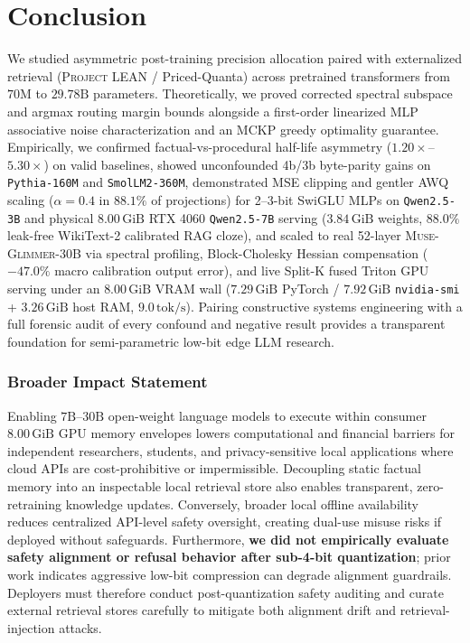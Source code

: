 \documentclass[10pt]{article} %
\newcommand{\lean}{\textsc{Project LEAN}}
\newcommand{\glimmer}{\textsc{Muse-Glimmer-30B}}
\begin{document}
\section{Conclusion}
\label{sec:conclusion}

We studied asymmetric post-training precision allocation paired with externalized retrieval (\lean{} / Priced-Quanta) across pretrained transformers from $70\text{M}$ to $29.78\text{B}$ parameters. Theoretically, we proved corrected spectral subspace and argmax routing margin bounds alongside a first-order linearized MLP associative noise characterization and an MCKP greedy optimality guarantee. Empirically, we confirmed factual-vs-procedural half-life asymmetry ($1.20\times$--$5.30\times$) on valid baselines, showed unconfounded 4b/3b byte-parity gains on \texttt{Pythia-160M} and \texttt{SmolLM2-360M}, demonstrated MSE clipping and gentler AWQ scaling ($\alpha=0.4$ in $88.1\%$ of projections) for 2--3-bit SwiGLU MLPs on \texttt{Qwen2.5-3B} and physical $8.00\,\text{GiB}$ RTX 4060 \texttt{Qwen2.5-7B} serving ($3.84\,\text{GiB}$ weights, $88.0\%$ leak-free WikiText-2 calibrated RAG cloze), and scaled to real 52-layer \glimmer{} via spectral profiling, Block-Cholesky Hessian compensation ($-47.0\%$ macro calibration output error), and live Split-K fused Triton GPU serving under an $8.00\,\text{GiB}$ VRAM wall ($7.29\,\text{GiB}$ PyTorch / $7.92\,\text{GiB}$ \texttt{nvidia-smi} + $3.26\,\text{GiB}$ host RAM, $9.0\,\text{tok/s}$). Pairing constructive systems engineering with a full forensic audit of every confound and negative result provides a transparent foundation for semi-parametric low-bit edge LLM research.

\subsubsection*{Broader Impact Statement}
Enabling $7\text{B}$--$30\text{B}$ open-weight language models to execute within consumer $8.00\,\text{GiB}$ GPU memory envelopes lowers computational and financial barriers for independent researchers, students, and privacy-sensitive local applications where cloud APIs are cost-prohibitive or impermissible. Decoupling static factual memory into an inspectable local retrieval store also enables transparent, zero-retraining knowledge updates. Conversely, broader local offline availability reduces centralized API-level safety oversight, creating dual-use misuse risks if deployed without safeguards. Furthermore, \textbf{we did not empirically evaluate safety alignment or refusal behavior after sub-4-bit quantization}; prior work indicates aggressive low-bit compression can degrade alignment guardrails. Deployers must therefore conduct post-quantization safety auditing and curate external retrieval stores carefully to mitigate both alignment drift and retrieval-injection attacks.
\end{document}
